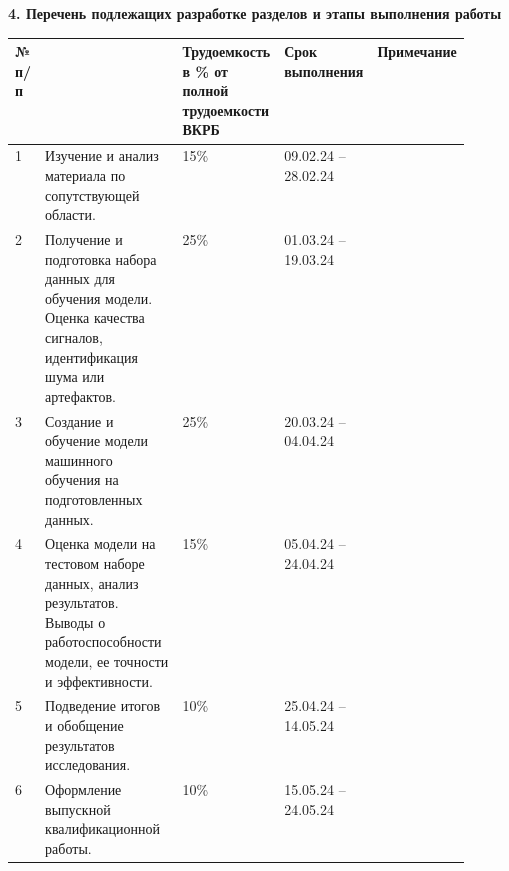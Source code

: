 {    \newpage
    \thispagestyle{empty}
    \noindent\textbf{4. Перечень подлежащих разработке разделов и этапы выполнения работы}

    \noindent
    \renewcommand{\tabularxcolumn}[1]{m{#1}}
    \begin{tabularx}{\linewidth}{
        | >{\centering\arraybackslash\footnotesize}m{0.03\linewidth}
        | >{\justifying\arraybackslash\footnotesize}X
        | >{\centering\arraybackslash\footnotesize}m{0.2\linewidth}
        | >{\centering\arraybackslash\footnotesize}m{0.18\linewidth}
        | >{\centering\arraybackslash\footnotesize}m{0.12\linewidth} |
    }
        \hline
        № п/п & \multicolumn{1}{|c|}{\footnotesize Наименование раздела или этапа} & Трудоемкость в \% от полной трудоемкости ВКРБ & Срок выполнения & Примечание\\ 
        \hline
        1 & \noindent Изучение и анализ материала по сопутствующей области. & 15\% & 09.02.24 -- 28.02.24 &  \\
        \hline
        2 & \noindent Получение и подготовка набора данных для обучения модели. Оценка качества сигналов, идентификация шума или артефактов. & 25\% & 01.03.24 -- 19.03.24 &  \\
        \hline
        3 & \noindent Создание и обучение модели машинного обучения на подготовленных данных. & 25\% & 20.03.24 -- 04.04.24 &  \\
        \hline
        4 & \noindent Оценка модели на тестовом наборе данных, анализ результатов. Выводы о работоспособности модели, ее точности и эффективности. & 15\% & 05.04.24 -- 24.04.24 &  \\
        \hline
        5 & \noindent Подведение итогов и обобщение результатов исследования. & 10\% & 25.04.24 -- 14.05.24 &  \\
        \hline
        6 & \noindent Оформление выпускной квалификационной работы. & 10\% & 15.05.24 -- 24.05.24 &  \\
        \hline

    \end{tabularx}

}
